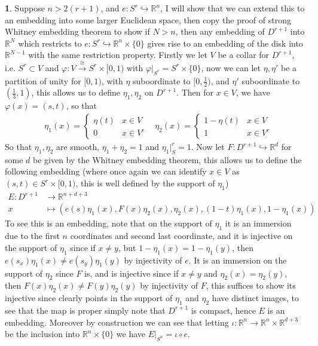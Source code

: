 \documentclass[10.5pt]{article}
\theoremstyle{definition}
\newtheorem{pb}{}
\newcommand{\set}[1]{\{#1\}}
\begin{document}
    \begin{pb}
        Suppose \(n > 2(r+1)\), and \(e: S^r \hookrightarrow \mathbb{R}^n\), I will show that we can extend this to an embedding into some larger Euclidean space, then copy the proof of strong Whitney embedding theorem to show if \(N > n\), then any embedding of \(D^{r+1}\) into \(\mathbb{R}^N\) which restricts to \(e: S^r \hookrightarrow \mathbb{R}^n \times \set{0}\) gives rise to an embedding of the disk into \(\mathbb{R}^{N-1}\) with the same restriction property. Firstly we let \(V\) be a collar for \(D^{r+1}\), i.e. \(S^r \subset V\) and \(\varphi: V \overset{\cong}{\to} S^{r} \times [0,1)\) with \(\varphi\vert_{S^r} = S^r \times \set{0}\), now we can let \(\eta, \eta'\) be a partition of unity for \([0,1)\), with \(\eta\) suboordinate to \([0,\frac12)\), and \(\eta'\) suboordinate to \((\frac13,1)\), this allows us to define \(\eta_1, \eta_2\) on \(D^{r+1}\). Then for \(x \in V\), we have \(\varphi(x) = (s,t)\), so that
        \begin{align*}
            &\eta_1(x) = \begin{cases}
                \eta(t) & x \in V \\ 0 & x \in V^c
            \end{cases}
            &\eta_2(x) = \begin{cases}
                1 - \eta(t) & x \in V \\
                1 & x \in V^c
            \end{cases}
        \end{align*}
        So that \(\eta_1,\eta_2\) are smooth, \(\eta_1 + \eta_2 = 1\) and \(\eta_1\vert_S^r = 1\). Now let \(F: D^{r+1} \hookrightarrow \mathbb{R}^d\) for some \(d\) be given by the Whitney embedding theorem, this allows us to define the following embedding (where once again we can identify \(x \in V\) as \((s,t) \in S^r\times[0,1)\), this is well defined by the support of \(\eta_1\))
        \begin{align*}
            E: D^{r+1} &\to \mathbb{R}^{n + d + 3} \\
            x &\mapsto (e(s)\eta_1(x),F(x)\eta_2(x),\eta_2(x),(1-t)\eta_1(x), 1 - \eta_1(x))
        \end{align*}
        To see this is an embedding, note that on the support of \(\eta_1\) it is an immersion due to the first \(n\) coordinates and second last coordinate, and it is injective on the support of \(\eta_1\) since if \(x \neq y\), but \(1 - \eta_1(x) = 1 - \eta_1(y)\), then \(e(s_x)\eta_1(x) \neq e(s_y)\eta_1(y)\) by injectivity of \(e\). It is an immersion on the support of \(\eta_2\) since \(F\) is, and is injective since if \(x \neq y\) and \(\eta_2(x) = \eta_2(y)\), then \(F(x)\eta_2(x) \neq F(y)\eta_2(y)\) by injectivity of \(F\), this suffices to show its injective since clearly points in the support of \(\eta_1\) and \(\eta_2\) have distinct images, to see that the map is proper simply note that \(D^{r+1}\) is compact, hence \(E\) is an embedding. Moreover by construction we can see that letting \(\iota: \mathbb{R}^n \to \mathbb{R}^n\times \mathbb{R}^{d+3}\) be the inclusion into \(\mathbb{R}^n \times \set{0}\) we have \(E\vert_{S^n} = \iota \circ e\).
        

\end{pb}
\end{document}
